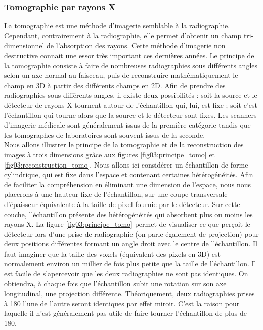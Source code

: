 		\subsubsection{Tomographie par rayons X}
			La tomographie est une méthode d'imagerie semblable à la radiographie. Cependant, contrairement à la radiographie, elle permet d'obtenir un champ tri-dimensionnel de l'absorption des rayons. Cette méthode d'imagerie non destructive connait une essor très important ces dernières années. Le principe de la tomographie consiste à faire de nombreuses radiographies sous différents angles selon un axe normal au faisceau, puis de reconstruire mathématiquement le champ en 3D à partir des différents champs en 2D. Afin de prendre des radiographies sous différents angles, il existe deux possibilités : soit la source et le détecteur de rayons X tournent autour de l'échantillon qui, lui, est fixe ; soit c'est l'échantillon qui tourne alors que la source et le détecteur sont fixes. Les scanners d'imagerie médicale sont généralement issus de la première catégorie tandis que les tomographes de laboratoires sont souvent issus de la seconde.
			\\Nous allons illustrer le principe de la tomographie et de la reconstruction des images à trois dimensions grâce aux figures \ref{fig03:principe_tomo} et \ref{fig03:reconstruction_tomo}. Nous allons ici considérer un échantillon de forme cylindrique, qui est fixe dans l'espace et contenant certaines hétérogénéités. Afin de faciliter la compréhension en éliminant une dimension de l'espace, nous nous placerons à une hauteur fixe de l'échantillon, sur une coupe transversale d'épaisseur équivalente à la taille de pixel fournie par le détecteur. Sur cette couche, l'échantillon présente des hétérogénéités qui absorbent plus ou moins les rayons X. La figure \ref{fig03:principe_tomo} permet de visualiser ce que perçoit le détecteur lors d'une prise de radiographie (on parle également de projection) pour deux positions différentes formant un angle droit avec le centre de l'échantillon. Il faut imaginer que la taille des voxels (équivalent des pixels en 3D) est normalement environ un millier de fois plus petite que la taille de l'échantillon. Il est facile de s'apercevoir que les deux radiographies ne sont pas identiques. On obtiendra, à chaque fois que l'échantillon subit une rotation sur son axe longitudinal, une projection différente. Théoriquement, deux radiographies prises à \SI{180}{\degres} l'une de l'autre seront identiques par effet miroir. C'est la raison pour laquelle il n'est généralement pas utile de faire tourner l'échantillon de plus de \SI{180}{\degres}.
